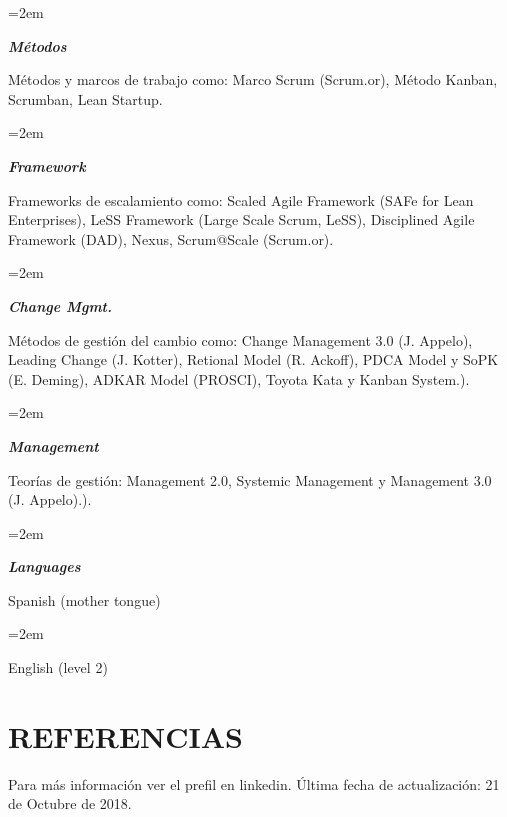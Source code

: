 \documentclass[paper=a4,fontsize=11pt]{scrartcl} %
\newlength{\spacebox}
\newcommand{\sepspace}{\vspace*{1em}}		%
\newcommand{\NewPart}[1]{\section*{\uppercase{#1}}}
\newcommand{\PersonalEntry}[2]{
		\noindent\hangindent=2em\hangafter=0 %
		\parbox{\spacebox}{        %
		\textit{#1}}		       %
		\hspace{1.5em} #2 \par}    %
\newcommand{\SkillsEntry}[2]{      %
		\noindent\hangindent=2em\hangafter=0 %
		\parbox{\spacebox}{        %
		\textit{#1}}			   %
		\hspace{1.5em} #2 \par}    %
\begin{document}
\sepspace

\SkillsEntry{\textbf{Métodos}}{Métodos y marcos de trabajo como: Marco Scrum (Scrum.or), Método Kanban, Scrumban, Lean Startup.
}
\sepspace

\SkillsEntry{\textbf{Framework}}{Frameworks de escalamiento como: Scaled Agile Framework (SAFe for Lean Enterprises), LeSS Framework (Large Scale Scrum, LeSS), Disciplined Agile Framework  (DAD), Nexus, Scrum@Scale (Scrum.or).
}
\sepspace

\SkillsEntry{\textbf{Change Mgmt.}}{Métodos de gestión del cambio como: Change Management 3.0 (J. Appelo), Leading Change (J. Kotter), Retional Model (R. Ackoff), PDCA Model y SoPK (E. Deming), ADKAR Model (PROSCI), Toyota Kata y Kanban System.).
}
\sepspace

\SkillsEntry{\textbf{Management}}{Teorías de gestión: Management 2.0, Systemic Management y Management 3.0 (J. Appelo).).
}
\sepspace

\SkillsEntry{\textbf{Languages}}{Spanish (mother tongue)}
\SkillsEntry{}{English (level 2)}

\sepspace




\NewPart{Referencias}{}
Para más información ver el prefil en linkedin.
Última fecha de actualización: 21 de Octubre de 2018.
\sepspace
\end{document}
